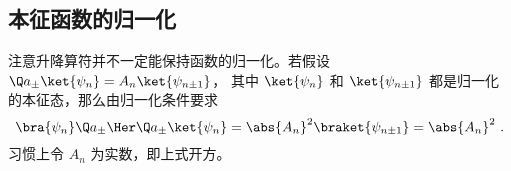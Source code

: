 \subsection{本征函数的归一化}
注意升降算符并不一定能保持函数的归一化。若假设 $\Q a_\pm \ket{\psi_n} = A_n \ket{\psi_{n\pm 1}}$， 其中 $\ket{\psi_n}$ 和 $\ket{\psi_{n \pm 1}}$ 都是归一化的本征态，那么由归一化条件要求
\begin{equation}
\bra{\psi_n} \Q a_\pm\Her \Q a_\pm \ket{\psi_n} = \abs{A_n}^2 \braket{\psi_{n\pm 1}} = \abs{A_n}^2~.
\end{equation}
习惯上令 $A_n$ 为实数，即上式开方。 















